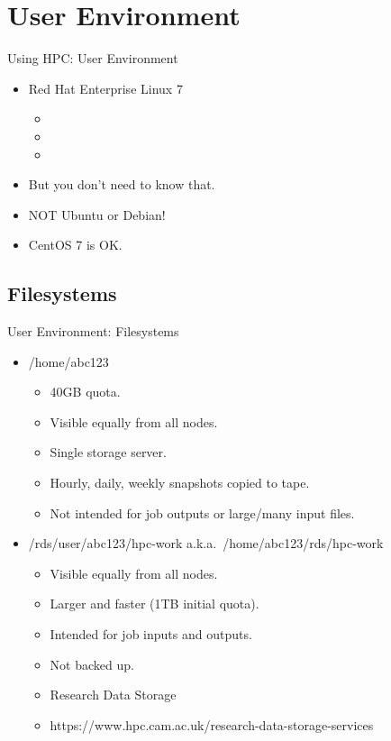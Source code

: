 
\section{User Environment}
\begin{frame}{Using HPC: User Environment}
\begin{itemize}
\item<1,3->{\alert<1>{{Red Hat Enterprise Linux 7}}}
\begin{itemize}
\item{}
\item{}
\item{}
\end{itemize}
\item<2->{But you don't need to know that.}
\item<4->{\color{red}NOT Ubuntu or Debian!}
\item<5>{\alert{CentOS 7 is OK.}}
\end{itemize}
\end{frame}

\subsection{Filesystems}
\begin{frame}{User Environment: Filesystems}
\begin{itemize}
\item{\alert{/home/abc123}}
\begin{itemize}
\item{40GB quota.}
\item{Visible equally from all nodes.}
\item{Single storage server.}
\item{Hourly, daily, weekly snapshots copied to tape.}
\item{Not intended for job outputs or large/many input files.}
\end{itemize}
\item{\alert{/rds/user/abc123/hpc-work} a.k.a.\ \alert{/home/abc123/rds/hpc-work}}
\begin{itemize}
\item{Visible equally from all nodes.}
\item{Larger and faster (1TB initial quota).}
\item{Intended for job inputs and outputs.}
\item{{\color{red}Not backed up.}}
  \pause
  \item{\alert{Research Data Storage}}
  \item{\alert{https://www.hpc.cam.ac.uk/research-data-storage-services}}
\end{itemize}
\end{itemize}
\end{frame}

